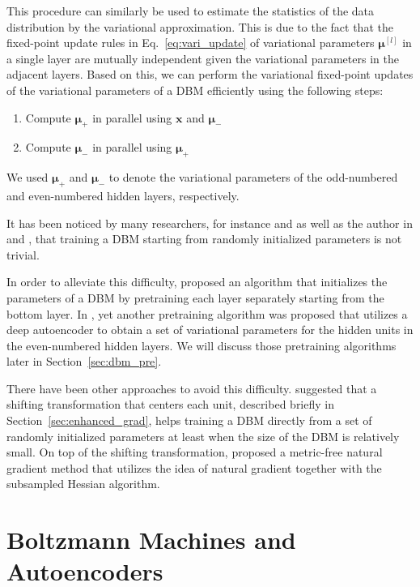 \documentclass[dissertation,nocontribution,draft*]{aaltoseries}
\newcommand{\qlay}[1]{\left[#1\right]}
\newcommand{\vect}[1]{\mathbf{#1}}
\newcommand{\vects}[1]{\boldsymbol{#1}}
\newcommand{\vx}[0]{\vect{x}}
\newcommand{\vmu}[0]{\vects{\mu}}
\begin{document}
This procedure can similarly be used to estimate the
statistics of the data distribution by the variational
approximation. This is due to the fact that the fixed-point
update rules in Eq.~\eqref{eq:vari_update} of variational
parameters $\vmu^{\qlay{l}}$ in a single layer are mutually
independent given the variational parameters in the adjacent
layers. Based on this, we can perform the variational
fixed-point updates of the variational parameters of a DBM
efficiently using the following steps:
\begin{enumerate}
    \itemsep 0em
    \item Compute $\vmu_+$ in parallel using $\vx$ and $\vmu_-$
    \item Compute $\vmu_-$ in parallel using $\vmu_+$
\end{enumerate}
We used $\vmu_+$ and $\vmu_-$ to denote the variational
parameters of the odd-numbered and even-numbered hidden
layers, respectively.

It has been noticed by many researchers, for instance
\citet{Salakhutdinov2009a} and \citet{Desjardins2012} as
well as the author in  and
, that training
a DBM starting from randomly initialized parameters is not
trivial. 

In order to alleviate this difficulty,
\citet{Salakhutdinov2009a,Salakhutdinov2012} proposed an
algorithm that initializes the parameters of a DBM by
pretraining each layer separately starting from the bottom
layer. In , yet another pretraining
algorithm was proposed that utilizes a deep autoencoder to
obtain a set of variational parameters for the hidden units
in the even-numbered hidden layers.  We will discuss those
pretraining algorithms later in Section~\ref{sec:dbm_pre}.

There have been other approaches to avoid this difficulty.
\citet{Montavon2012} suggested that a shifting
transformation that centers each unit, described briefly in
Section~\ref{sec:enhanced_grad}, helps training a
DBM directly from a set of randomly initialized parameters
at least when the size of the DBM is relatively small.  On
top of the shifting transformation, \citet{Desjardins2013}
proposed a metric-free natural gradient method that utilizes
the idea of natural gradient together with the subsampled
Hessian algorithm. 



\section{Boltzmann Machines and Autoencoders}
\label{sec:bm_aenc}
\end{document}
